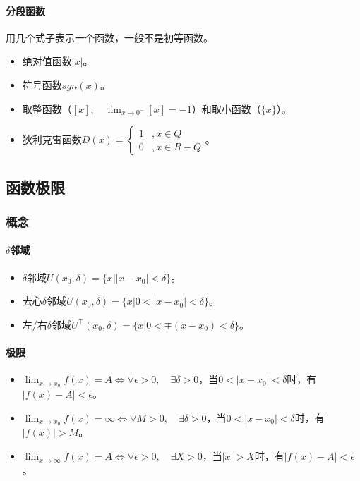 \documentclass[
12pt, %
a4paper, 
oneside, %
]{scrartcl}
\begin{document}
\paragraph{分段函数}
用几个式子表示一个函数，一般不是初等函数。
\begin{itemize}
\item 绝对值函数$ |x| $。
\item 符号函数$ sgn(x) $。
\item 取整函数（$ [x], \quad \lim_{x \to 0^-} [x] = -1 $）和取小函数（$ \{x\} $）。
\item 狄利克雷函数$ D(x)= \begin{cases} 1 &, x \in Q \\ 0 &, x \in R - Q \end{cases} $。
\end{itemize}
\subsection[函数极限]{函数极限}
\subsubsection[概念]{概念}
\paragraph{$ \delta $邻域}
\begin{itemize}
\item $ \delta $邻域$ U(x_0, \delta) = \{x||x - x_0| < \delta\} $。
\item 去心$ \delta $邻域$ \mathring{U}(x_0, \delta) = \{x|0 < |x -x _0| < \delta\} $。
\item 左/右$ \delta $邻域$ U^{\mp}(x_0, \delta) = \{x|0 < \mp (x - x_0) < \delta\} $。
\end{itemize}
\paragraph{极限}
\begin{itemize}
\item $ \lim_{x \to x_0} f(x) = A \Leftrightarrow \forall \epsilon > 0, \quad \exists \delta > 0 $，当$ 0 < |x - x_0|< \delta $时，有$ |f(x) - A| < \epsilon $。
\item $ \lim_{x \to x_0} f(x) = \infty \Leftrightarrow \forall M > 0, \quad \exists \delta > 0 $，当$ 0 < |x - x_0|< \delta $时，有$ |f(x)| > M $。
\item $ \lim_{x \to \infty} f(x) = A \Leftrightarrow \forall \epsilon > 0, \quad \exists X > 0 $，当$ |x|> X $时，有$ |f(x) - A| < \epsilon $。
\end{itemize}
\end{document}
